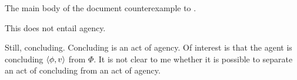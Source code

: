\begin{note}
  \color{blue}
  The main body of the document counterexample to \issueInclusion{}.

  This does not entail agency.

  Still, concluding.
  Concluding is an act of agency.
  Of interest is that the agent is concluding \(\langle\phi, v\rangle\) from \(\Phi\).
  It is not clear to me whether it is possible to separate an act of concluding from an act of agency.
\end{note}








